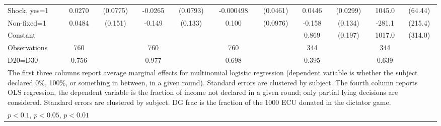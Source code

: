 \begin{tabular}{l|cccccc|cc|cc}
Shock, yes=1    &   0.0270         & (0.0775)&  -0.0265         & (0.0793)&-0.000498         & (0.0461)&   0.0446         & (0.0299)&   1045.0\sym{***}&  (64.44)\\
Non-fixed=1     &   0.0484         &  (0.151)&   -0.149         &  (0.133)&    0.100         & (0.0976)&   -0.158         &  (0.134)&   -281.1         &  (215.4)\\
Constant        &                  &         &                  &         &                  &         &    0.869\sym{***}&  (0.197)&   1017.0\sym{***}&  (314.0)\\
\hline
Observations    &      760         &         &      760         &         &      760         &         &      344         &         &      344         &         \\
D20=D30         &    0.756         &         &    0.977         &         &    0.698         &         &    0.395         &         &    0.639         &         \\
\hline\hline
\multicolumn{11}{p{18cm}}{\tiny The first three columns report average marginal effects for multinomial logistic regression (dependent variable is whether the subject declared 0\%,  100\%, or something in between, in a given round). Standard errors are clustered by subject. The fourth column reports OLS regression, the dependent variable is the fraction of income not declared in a given round; only partial lying decisions are considered. Standard errors are clustered by subject. DG frac is the fraction of the 1000 ECU donated in the dictator game.}\\
\multicolumn{11}{l}{\tiny \sym{*} \(p<0.1\), \sym{**} \(p<0.05\), \sym{***} \(p<0.01\)}\\
\end{tabular}